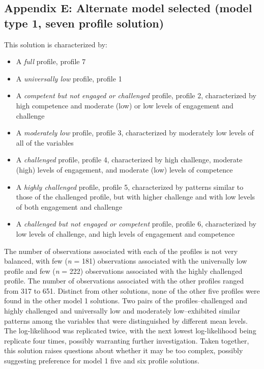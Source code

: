 \documentclass[]{msu-thesis}
\providecommand{\tightlist}{%
  \setlength{\itemsep}{0pt}\setlength{\parskip}{0pt}}
\theoremstyle{definition}
\theoremstyle{definition}
\theoremstyle{definition}
\theoremstyle{remark}
\begin{document}
\subsection{Appendix E: Alternate model selected (model type 1, seven
profile
solution)}\label{appendix-e-alternate-model-selected-model-type-1-seven-profile-solution}

This solution is characterized by:

\begin{itemize}
\tightlist
\item
  A \emph{full} profile, profile 7
\item
  A \emph{universally low} profile, profile 1
\item
  A \emph{competent but not engaged or challenged} profile, profile 2,
  characterized by high competence and moderate (low) or low levels of
  engagement and challenge
\item
  A \emph{moderately low} profile, profile 3, characterized by
  moderately low levels of all of the variables
\item
  A \emph{challenged} profile, profile 4, characterized by high
  challenge, moderate (high) levels of engagement, and moderate (low)
  levels of competence
\item
  A \emph{highly challenged} profile, profile 5, characterized by
  patterns similar to those of the challenged profile, but with higher
  challenge and with low levels of both engagement and challenge
\item
  A \emph{challenged but not engaged or competent} profile, profile 6,
  characterized by low levels of challenge, and high levels of
  engagement and competence
\end{itemize}

The number of observations associated with each of the profiles is not
very balanced, with few (\emph{n} = 181) observations associated with
the universally low profile and few (\emph{n} = 222) observations
associated with the highly challenged profile. The number of
observations associated with the other profiles ranged from 317 to 651.
Distinct from other solutions, none of the other five profiles were
found in the other model 1 solutions. Two pairs of the
profiles--challenged and highly challenged and universally low and
moderately low--exhibited similar patterns among the variables that were
distinguished by different mean levels. The log-likelihood was
replicated twice, with the next lowest log-likelihood being replicate
four times, possibly warranting further investigation. Taken together,
this solution raises questions about whether it may be too complex,
possibly suggesting preference for model 1 five and six profile
solutions.


\end{document}
